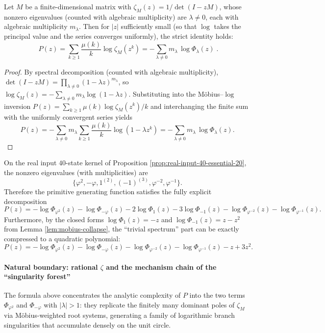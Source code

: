 \begin{proposition}\label{prop:mu-pochhammer-decomposition}
Let \(M\) be a finite-dimensional matrix with \(\zeta_M(z)=1/\det(I-zM)\), whose nonzero eigenvalues (counted with algebraic multiplicity) are \(\lambda\neq 0\), each with algebraic multiplicity \(m_\lambda\).
Then for \(|z|\) sufficiently small (so that \(\log\) takes the principal value and the series converges uniformly), the strict identity holds:
\[
\boxed{\;
P(z)
=\sum_{k\ge 1}\frac{\mu(k)}{k}\log\zeta_M(z^k)
=-\sum_{\lambda\neq 0}m_\lambda\,\log\Phi_\lambda(z)\; }.
\]
\end{proposition}
\begin{proof}
By spectral decomposition (counted with algebraic multiplicity),
\(
\det(I-zM)=\prod_{\lambda\neq 0}(1-\lambda z)^{m_\lambda}
\),
so
\(
\log\zeta_M(z)
=-\sum_{\lambda\neq 0}m_\lambda\log(1-\lambda z)
\).
Substituting into the M\"obius--$\log$ inversion
\(
P(z)=\sum_{k\ge 1}\mu(k)\log\zeta_M(z^k)/k
\) and interchanging the finite sum with the uniformly convergent series yields
\[
P(z)
=-\sum_{\lambda\neq 0}m_\lambda\sum_{k\ge 1}\frac{\mu(k)}{k}\log(1-\lambda z^k)
=-\sum_{\lambda\neq 0}m_\lambda\,\log\Phi_\lambda(z).
\]
\end{proof}

\begin{corollary}\label{cor:real-input-40-mu-pochhammer-explicit}
On the real input \(40\)-state kernel of Proposition \ref{prop:real-input-40-essential-20}, the nonzero eigenvalues (with multiplicities) are
\[
\{\varphi^2,-\varphi,1^{(2)},(-1)^{(3)},\varphi^{-2},\varphi^{-1}\}.
\]
Therefore the primitive generating function satisfies the fully explicit decomposition
\[
\boxed{
P(z)=
-\log\Phi_{\varphi^2}(z)
-\log\Phi_{-\varphi}(z)
-2\log\Phi_{1}(z)
-3\log\Phi_{-1}(z)
-\log\Phi_{\varphi^{-2}}(z)
-\log\Phi_{\varphi^{-1}}(z).
}
\]
Furthermore, by the closed forms \(\log\Phi_{1}(z)=-z\) and \(\log\Phi_{-1}(z)=z-z^2\) from Lemma \ref{lem:mobius-collapse}, the ``trivial spectrum'' part can be exactly compressed to a quadratic polynomial:
\[
\boxed{
P(z)=
-\log\Phi_{\varphi^2}(z)
-\log\Phi_{-\varphi}(z)
-\log\Phi_{\varphi^{-2}}(z)
-\log\Phi_{\varphi^{-1}}(z)
-z+3z^2.
}
\]
\end{corollary}

\paragraph{Natural boundary: rational \texorpdfstring{$\zeta$}{zeta} and the mechanism chain of the ``singularity forest''}
The formula above concentrates the analytic complexity of \(P\) into the two terms \(\Phi_{\varphi^2}\) and \(\Phi_{-\varphi}\) with \(|\lambda|>1\): they replicate the finitely many dominant poles of \(\zeta_M\) via M\"obius-weighted root systems, generating a family of logarithmic branch singularities that accumulate densely on the unit circle.

